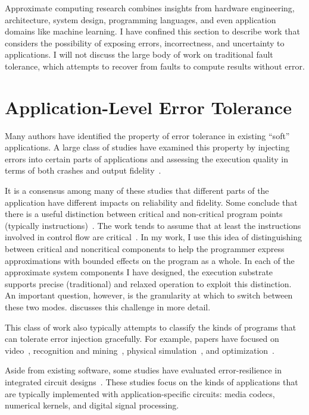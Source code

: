 Approximate computing research combines insights from hardware engineering,
architecture, system design, programming languages, and even application
domains like machine learning. I have confined this section to describe work
that considers the possibility of exposing errors, incorrectness, and
uncertainty to applications. I will not discuss the large body of work on
traditional fault tolerance, which attempts to recover from faults to compute
results without error.

\section{Application-Level Error Tolerance}
\label{sec:related:studies}

Many authors have identified the property of error tolerance in existing
``soft''
applications. A large class of studies have examined this property by
injecting errors into certain parts of applications and assessing the
execution quality in terms of both crashes and output fidelity~\cite{li06,
li07, li08, dekruijf-selse09, wong-selse06, palem-arcs, freton, besteffort,
yeh, thaker-iiswc06, efc, llfi, chippa-dac}.

It is a consensus among many of these studies that different parts of the
application have different impacts on reliability and fidelity. Some conclude
that there is a useful distinction between critical and non-critical program
points (typically instructions)~\cite{palem-arcs, thaker-iiswc06, flikker,
llfi}.
The work tends to assume that at least the instructions involved in control
flow are critical~\cite{thaker-iiswc06}. In my work, I use this idea of
distinguishing between critical and noncritical components to help the
programmer express approximations with bounded effects on the program as a
whole. In each of the approximate system components I have designed, the
execution substrate supports precise (traditional) and relaxed operation to
exploit this distinction. An important question, however, is the granularity
at which to switch between these two modes.  discusses
this challenge in more detail.

This class of work also typically attempts to classify the kinds of programs
that can tolerate error injection gracefully. For example, papers have focused
on video~\cite{freton}, recognition and mining~\cite{besteffort}, physical
simulation~\cite{yeh}, and optimization~\cite{hogwild}.

Aside from existing software, some studies have evaluated error-resilience in
integrated circuit designs~\cite{breuer, scalable-effort-hardware}. These
studies focus on the kinds of applications that are typically implemented with
application-specific circuits: media codecs, numerical kernels, and digital
signal processing.


